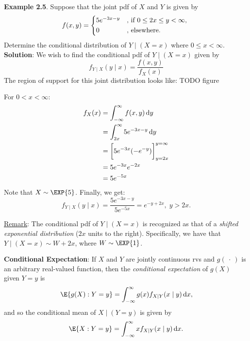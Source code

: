 \begin{Example}{}
    \textbf{Example 2.5}. Suppose that the joint pdf of $ X $ and $ Y $ is given by
    \[ f(x,y)=\begin{cases*}
            5e^{-3x-y} & \text{, if $ 0\le 2x\le y< \infty $,} \\
            0          & \text{, elsewhere}.
        \end{cases*} \]
    Determine the conditional distribution of $ Y\mid(X=x) $ where $ 0\le x< \infty $.
    \tcblower{}
    \textbf{Solution}: We wish to find the conditional pdf of $ Y\mid(X=x) $ given by
    \[f_{Y\mid X}(y\mid x)=\frac{f(x,y)}{f_X(x)}\]
    The region of support for this joint distribution looks like:
    TODO figure

    For $ 0<x<\infty $:
    \begin{align*}
        f_X(x)
         & =\int_{-\infty}^{\infty}f(x,y)\odif{y}             \\
         & =\int_{2x}^{\infty}5e^{-3x-y}\odif{y}              \\
         & =\biggl[5e^{-3x}(-e^{-y})\biggr]_{y=2x}^{y=\infty} \\
         & =5e^{-3x}e^{-2x}                                   \\
         & =5e^{-5x}
    \end{align*}
    Note that $ X \sim \EXP{5} $. Finally, we get:
    \[ f_{Y\mid X}(y\mid x)=\frac{5e^{-3x-y}}{5e^{-5x}}=e^{-y+2x},\; y> 2x.  \]
\end{Example}
\underline{Remark}: The conditional pdf of $ Y\mid (X=x) $ is recognized as that of a \emph{shifted exponential distribution}
($2x$ units to the right). Specifically, we have that $ Y\mid(X=x) \sim W+2x $, where $ W \sim \EXP{1} $.
\begin{Regular}{}
    \textbf{Conditional Expectation}: If $ X $ and $ Y $ are jointly continuous rvs and $ g(\:\cdot\:) $ is an arbitrary
    real-valued function, then the \emph{conditional expectation} of $ g(X) $ given $ Y=y $ is
    \[ \E{g(X)\given Y=y}=\int_{-\infty}^{\infty}g(x)f_{X\mid Y}(x\mid y)\odif{x}, \]
    and so the conditional mean of $ X\mid(Y=y) $ is given by
    \[ \E{X\given Y=y}=\int_{-\infty}^{\infty}x f_{X\mid Y}(x\mid y)\odif{x}. \]
\end{Regular}
